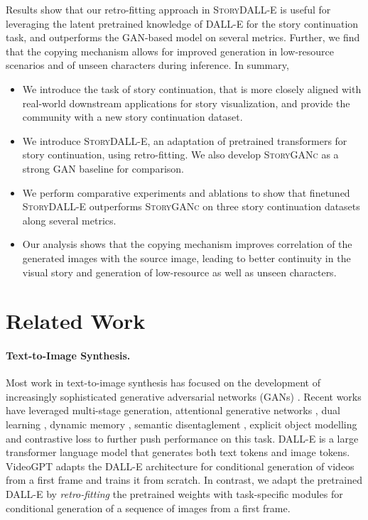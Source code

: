 \documentclass[runningheads]{llncs}
\newcommand{\sdalle}[1]{\textsc{StoryDALL-E}}
\newcommand{\sgan}[1]{\textsc{StoryGANc}}
\begin{document}
Results show that our retro-fitting approach in \sdalle{} is useful for leveraging the latent pretrained knowledge of DALL-E for the story continuation task, and outperforms the GAN-based model on several metrics. Further, we find that the copying mechanism allows for improved generation in low-resource scenarios and of unseen characters during inference. In summary,
\begin{itemize}
    \item We introduce the task of story continuation, that is more closely aligned with real-world downstream applications for story visualization, and provide the community with a new story continuation dataset.
    \item We introduce \sdalle{}, an adaptation of pretrained transformers for story continuation, using retro-fitting. We also develop \sgan{} as a strong GAN baseline for comparison.
    \item We perform comparative experiments and ablations to show that finetuned \sdalle{} outperforms \sgan{} on three story continuation datasets along several metrics.
    \item Our analysis shows that the copying mechanism improves correlation of the generated images with the source image, leading to better continuity in the visual story and generation of low-resource as well as unseen characters.
\end{itemize}

\section{Related Work}

\paragraph{Text-to-Image Synthesis.}
Most work in text-to-image synthesis has focused on the development of increasingly sophisticated generative adversarial networks (GANs) \cite{goodfellow2014generative}. Recent works have leveraged multi-stage generation\cite{han2017stackgan}, attentional generative networks \cite{xu2018attngan}, dual learning \cite{qiao2019mirrorgan}, dynamic memory \cite{zhu2019dm, liang2019cpgan}, semantic disentaglement \cite{yin2019semantics}, explicit object modelling \cite{hinz2020semantic} and contrastive loss \cite{zhang2021cross, kang2020contragan} to further push performance on this task. DALL-E \cite{ramesh2021zero} is a large transformer language model that generates both text tokens and image tokens. VideoGPT \cite{yan2021videogpt} adapts the DALL-E architecture for conditional generation of videos from a first frame and trains it from scratch. In contrast, we adapt the pretrained DALL-E by \textit{retro-fitting} the pretrained weights with task-specific modules for conditional generation of a sequence of images from a first frame.
\end{document}
